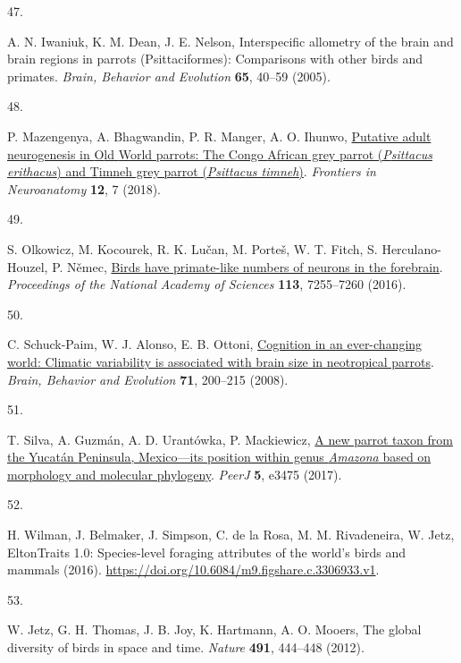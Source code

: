 \documentclass[
  man,floatsintext]{apa6}
\newlength{\cslhangindent}
\newlength{\csllabelwidth}
\newlength{\cslentryspacingunit} %
\newenvironment{CSLReferences}[2] %
 {%
  \setlength{\parindent}{0pt}
  \ifodd #1
  \let\oldpar\par
  \def\par{\hangindent=\cslhangindent\oldpar}
  \fi
  \setlength{\parskip}{#2\cslentryspacingunit}
 }%
 {}
\newcommand{\CSLLeftMargin}[1]{\parbox[t]{\csllabelwidth}{#1}}
\newcommand{\CSLRightInline}[1]{\parbox[t]{\linewidth - \csllabelwidth}{#1}\break}
\begin{document}
\begin{CSLReferences}{0}{0}
\leavevmode{}%
\CSLLeftMargin{47. }%
\CSLRightInline{A. N. Iwaniuk, K. M. Dean, J. E. Nelson, Interspecific allometry of the brain and brain regions in parrots ({P}sittaciformes): Comparisons with other birds and primates. \emph{Brain, Behavior and Evolution} \textbf{65}, 40--59 (2005).}

\leavevmode{}%
\CSLLeftMargin{48. }%
\CSLRightInline{P. Mazengenya, A. Bhagwandin, P. R. Manger, A. O. Ihunwo, \href{https://doi.org/10.3389/fnana.2018.00007}{Putative adult neurogenesis in {O}ld {W}orld parrots: The {C}ongo {A}frican grey parrot (\emph{{P}sittacus erithacus}) and {T}imneh grey parrot (\emph{{P}sittacus timneh})}. \emph{Frontiers in Neuroanatomy} \textbf{12}, 7 (2018).}

\leavevmode{}%
\CSLLeftMargin{49. }%
\CSLRightInline{S. Olkowicz, M. Kocourek, R. K. Lučan, M. Porteš, W. T. Fitch, S. Herculano-Houzel, P. Němec, \href{https://doi.org/10.1073/pnas.1517131113}{Birds have primate-like numbers of neurons in the forebrain}. \emph{Proceedings of the National Academy of Sciences} \textbf{113}, 7255--7260 (2016).}

\leavevmode{}%
\CSLLeftMargin{50. }%
\CSLRightInline{C. Schuck-Paim, W. J. Alonso, E. B. Ottoni, \href{https://doi.org/10.1159/000119710}{Cognition in an ever-changing world: Climatic variability is associated with brain size in neotropical parrots}. \emph{Brain, Behavior and Evolution} \textbf{71}, 200--215 (2008).}

\leavevmode{}%
\CSLLeftMargin{51. }%
\CSLRightInline{T. Silva, A. Guzmán, A. D. Urantówka, P. Mackiewicz, \href{https://doi.org/10.7717/peerj.3475}{A new parrot taxon from the {Y}ucat{á}n {P}eninsula, {M}exico---its position within genus \emph{{A}mazona} based on morphology and molecular phylogeny}. \emph{PeerJ} \textbf{5}, e3475 (2017).}

\leavevmode{}%
\CSLLeftMargin{52. }%
\CSLRightInline{H. Wilman, J. Belmaker, J. Simpson, C. de la Rosa, M. M. Rivadeneira, W. Jetz, EltonTraits 1.0: Species-level foraging attributes of the world's birds and mammals (2016). \url{https://doi.org/10.6084/m9.figshare.c.3306933.v1}.}

\leavevmode{}%
\CSLLeftMargin{53. }%
\CSLRightInline{W. Jetz, G. H. Thomas, J. B. Joy, K. Hartmann, A. O. Mooers, The global diversity of birds in space and time. \emph{Nature} \textbf{491}, 444--448 (2012).}


\end{CSLReferences}
\end{document}
